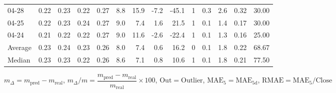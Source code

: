 \begin{threeparttable}
{\begin{tabular}{lrrrrrrrrrrrrr}
  04-28 &          0.22 &          0.23 &          0.22 &        0.27 &                 8.8 &                15.9 &       -7.2 &        -45.1 &              1 &                 0.3 &              2.6 &            0.32 &                  30.00 \\
  04-25 &          0.22 &          0.23 &          0.24 &        0.27 &                 9.0 &                 7.4 &        1.6 &         21.5 &              1 &                 0.1 &              1.4 &            0.17 &                  30.00 \\
  04-24 &          0.21 &          0.22 &          0.22 &        0.27 &                 9.0 &                11.6 &       -2.6 &        -22.4 &              1 &                 0.1 &              1.3 &            0.16 &                  25.00 \\
Average &          0.23 &          0.24 &          0.23 &        0.26 &                 8.0 &                 7.4 &        0.6 &         16.2 &              0 &                 0.1 &              1.8 &            0.22 &                  68.67 \\
 Median &          0.23 &          0.23 &          0.22 &        0.26 &                 8.6 &                 7.1 &        0.8 &         10.6 &              1 &                 0.1 &              1.8 &            0.21 &                  77.50 \\
\bottomrule
\end{tabular}
}
\begin{tablenotes}\footnotesize
\item $m_\Delta=m_{\text{pred}}-m_{\text{real}}$,
$m_\Delta/m=\dfrac{m_{\text{pred}}-m_{\text{real}}}{m_{\text{real}}}\times100$,
$\mathrm{Out}=\text{Outlier}$,
$\mathrm{MAE}_5=\mathrm{MAE}_{5\text{d}}$,
$\mathrm{RMAE}=\mathrm{MAE}_5/\text{Close}$
\end{tablenotes}
\end{threeparttable}
\endgroup


